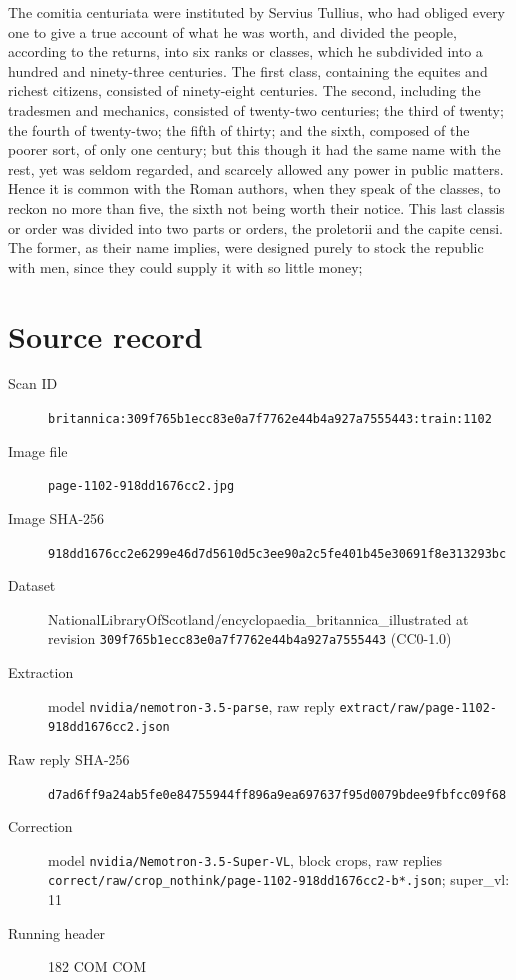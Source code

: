 \documentclass{article}
\begin{document}
The comitia centuriata were instituted by Servius Tullius, who had obliged every one to give a true account of what he was worth, and divided the people, according to the returns, into six ranks or classes, which he subdivided into a hundred and ninety-three centuries. The first class, containing the equites and richest citizens, consisted of ninety-eight centuries. The second, including the tradesmen and mechanics, consisted of twenty-two centuries; the third of twenty; the fourth of twenty-two; the fifth of thirty; and the sixth, composed of the poorer sort, of only one century; but this though it had the same name with the rest, yet was seldom regarded, and scarcely allowed any power in public matters. Hence it is common with the Roman authors, when they speak of the classes, to reckon no more than five, the sixth not being worth their notice. This last classis or order was divided into two parts or orders, the proletorii and the capite censi. The former, as their name implies, were designed purely to stock the republic with men, since they could supply it with so little money;


\section*{Source record}
\begin{description}
\item[Scan ID] \texttt{britannica:309f765b1ecc83e0a7f7762e44b4a927a7555443:train:1102}
\item[Image file] \texttt{page-1102-918dd1676cc2.jpg}
\item[Image SHA-256] \texttt{918dd1676cc2e6299e46d7d5610d5c3ee90a2c5fe401b45e30691f8e313293bc}
\item[Dataset] NationalLibraryOfScotland/encyclopaedia\_britannica\_illustrated at revision \texttt{309f765b1ecc83e0a7f7762e44b4a927a7555443} (CC0-1.0)
\item[Extraction] model \texttt{nvidia/nemotron-3.5-parse}, raw reply \texttt{extract/raw/page-1102-918dd1676cc2.json}
\item[Raw reply SHA-256] \texttt{d7ad6ff9a24ab5fe0e84755944ff896a9ea697637f95d0079bdee9fbfcc09f68}
\item[Correction] model \texttt{nvidia/Nemotron-3.5-Super-VL}, block crops, raw replies \texttt{correct/raw/crop\_nothink/page-1102-918dd1676cc2-b*.json}; super\_vl: 11
\item[Running header] 182 COM COM
\end{description}
\end{document}
